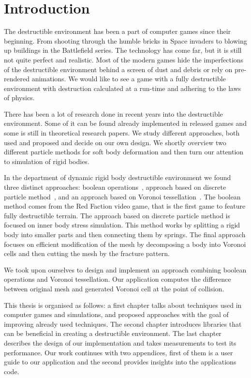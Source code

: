 \chapter*{Introduction}

The destructible environment has been a part of computer games since their beginning. From shooting through the humble bricks in Space invaders to blowing up buildings in the Battlefield series. The technology has come far, but it is still not quite perfect and realistic. Most of the modern games hide the imperfections of the destructible environment behind a screen of dust and debris or rely on pre-rendered animations. We would like to see a game with a fully destructible environment with destruction calculated at a run-time and adhering to the laws of physics.

There has been a lot of research done in recent years into the destructible environment. Some of it can be found already implemented in released games and some is still in theoretical research papers. We study different approaches, both used and proposed and decide on our own design. We shortly overview two different particle methods for soft body deformation and then turn our attention to simulation of rigid bodies. 

In the department of dynamic rigid body destructible environment we found three distinct approaches: boolean operations~\cite{geomod}, approach based on discrete particle method~\cite{edem}, and an approach based on Voronoi tessellation~\cite{nvidia}. The boolean method comes from the Red Faction video game, that is the first game to feature fully destructible terrain. The approach based on discrete particle method is focused on inner body stress simulation. This method works by splitting a rigid body into smaller parts and then connecting them by springs. The final approach focuses on efficient modification of the mesh by decomposing a body into Voronoi cells and then cutting the mesh by the fracture pattern.

We took upon ourselves to design and implement an approach combining boolean operations and Voronoi tessellation. Our application computes the difference between original mesh and generated Voronoi cell at the point of collision.

This thesis is organised as follows: a first chapter talks about techniques used in computer games and simulations, and proposed approaches with the goal of improving already used techniques. The second chapter introduces libraries that can be beneficial in creating a destructible environment. The last chapter describes the design of our implementation and takes measurements to test its performance. Our work continues with two appendices, first of them is a user guide to our application and the second provides insights into the applications code. 

